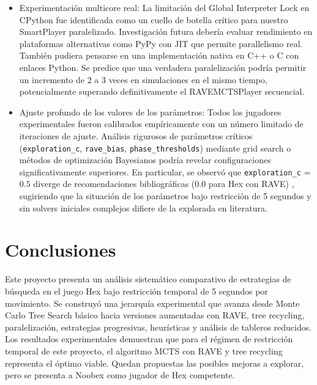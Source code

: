 \documentclass[12pt]{article}
\begin{document}
\begin{itemize}
	\item Experimentación multicore real: La limitación del Global Interpreter Lock en CPython fue identificada como un cuello de botella crítico para nuestro SmartPlayer paralelizado. Investigación futura debería evaluar rendimiento en plataformas alternativas como PyPy con JIT que permite parallelismo real. También pudiera pensarse en una implementación nativa en C++ o C con enlaces Python. Se predice que una verdadera paralelización podría permitir un incremento de 2 a 3 veces en simulaciones en el mismo tiempo, potencialmente superando definitivamente el RAVEMCTSPlayer secuencial.
	\item Ajuste profundo de los valores de los parámetros: Todos los jugadores experimentales fueron calibrados empíricamente con un número limitado de iteraciones de ajuste. Análisis rigurosos de parámetros críticos (\texttt{exploration\_c}, \texttt{rave\_bias}, \texttt{phase\_thresholds}) mediante grid search o métodos de optimización Bayesianos podría revelar configuraciones significativamente superiores. En particular, se observó que \texttt{exploration\_c} = $0.5$ diverge de recomendaciones bibliográficas ($0.0$ para Hex con RAVE) \cite{Cazenave2009}, sugiriendo que la situación de los parámetros bajo restricción de 5 segundos y sin solvers iniciales complejos difiere de la explorada en literatura.
\end{itemize}

\section{Conclusiones}

Este proyecto presenta un análisis sistemático comparativo de estrategias de búsqueda en el juego Hex bajo restricción temporal de 5 segundos por movimiento. Se construyó una jerarquía experimental que avanza desde Monte Carlo Tree Search básico hacia versiones aumentadas con RAVE, tree recycling, paralelización, estrategias progresivas, heurísticas y análisis de tableros reducidos. Los resultados experimentales demuestran que para el régimen de restricción temporal de este proyecto, el algoritmo MCTS con RAVE y tree recycling representa el óptimo viable. Quedan propuestas las posibles mejoras a explorar, pero se presenta a Noobex como jugador de Hex competente.
\end{document}
